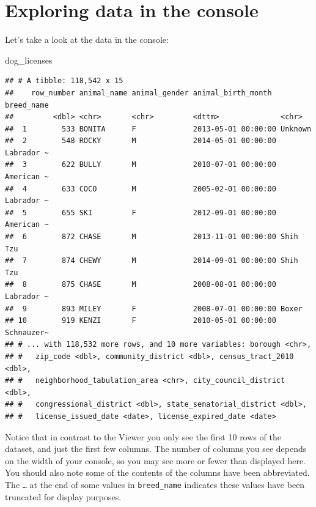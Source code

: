 \documentclass[]{Nemilov}
\newenvironment{Shaded}{\begin{snugshade}}{\end{snugshade}}
\newcommand{\NormalTok}[1]{#1}
\begin{document}
\hypertarget{exploring-data-in-the-console}{%
\section{Exploring data in the console}\label{exploring-data-in-the-console}}

Let's take a look at the data in the console:

\begin{Shaded}
\begin{Highlighting}[]
\NormalTok{dog_licenses}
\end{Highlighting}
\end{Shaded}

\begin{verbatim}
## # A tibble: 118,542 x 15
##    row_number animal_name animal_gender animal_birth_month  breed_name
##         <dbl> <chr>       <chr>         <dttm>              <chr>     
##  1        533 BONITA      F             2013-05-01 00:00:00 Unknown   
##  2        548 ROCKY       M             2014-05-01 00:00:00 Labrador ~
##  3        622 BULLY       M             2010-07-01 00:00:00 American ~
##  4        633 COCO        M             2005-02-01 00:00:00 Labrador ~
##  5        655 SKI         F             2012-09-01 00:00:00 American ~
##  6        872 CHASE       M             2013-11-01 00:00:00 Shih Tzu  
##  7        874 CHEWY       M             2014-09-01 00:00:00 Shih Tzu  
##  8        875 CHASE       M             2008-08-01 00:00:00 Labrador ~
##  9        893 MILEY       F             2008-07-01 00:00:00 Boxer     
## 10        919 KENZI       F             2010-05-01 00:00:00 Schnauzer~
## # ... with 118,532 more rows, and 10 more variables: borough <chr>,
## #   zip_code <dbl>, community_district <dbl>, census_tract_2010 <dbl>,
## #   neighborhood_tabulation_area <chr>, city_council_district <dbl>,
## #   congressional_district <dbl>, state_senatorial_district <dbl>,
## #   license_issued_date <date>, license_expired_date <date>
\end{verbatim}

Notice that in contrast to the Viewer you only see the first 10 rows of the dataset, and just the first few columns. The number of columns you see depends on the width of your console, so you may see more or fewer than displayed here. You should also note some of the contents of the columns have been abbreviated. The \texttt{\ldots{}} at the end of some values in \texttt{breed\_name} indicates these values have been truncated for display purposes.
\end{document}

